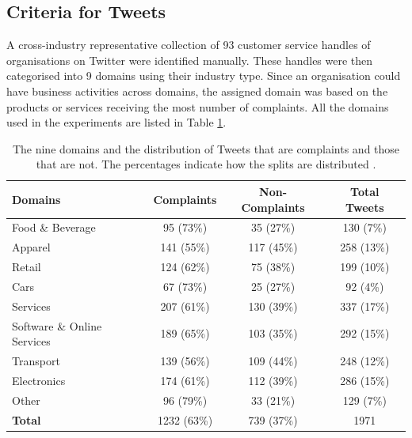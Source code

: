 \subsection{Criteria for Tweets}
A cross-industry representative collection of 93 customer service handles of organisations on Twitter were identified manually. These handles were then categorised into 9 domains using their industry type. Since an organisation could have business activities across domains, the assigned domain was based on the products or services receiving the most number of complaints. All the domains used in the experiments are listed in Table \ref{tab: domains}.
\begin{table}[ht]
    \captionsetup{font=small}
    \small
    \centering
    \begin{tabularx}{\textwidth}{|X|c|c|c|}
        \hline
        \rowcolor[gray]{0.7}
        \textbf{Domains}            & \textbf{Complaints} & \textbf{Non-Complaints} & \textbf{Total Tweets} \\
        \hline
        Food \& Beverage            & 95 \small{(73\%)}   & 35 \small{(27\%)}       & 130 \small{(7\%)}     \\
        \rowcolor[gray]{0.9}
        Apparel                     & 141 \small{(55\%)}  & 117 \small{(45\%)}      & 258 \small{(13\%)}    \\
        Retail                      & 124 \small{(62\%)}  & 75 \small{(38\%)}       & 199 \small{(10\%)}    \\
        \rowcolor[gray]{0.9}
        Cars                        & 67 \small{(73\%)}   & 25 \small{(27\%)}       & 92 \small{(4\%)}      \\
        Services                    & 207 \small{(61\%)}  & 130 \small{(39\%)}      & 337 \small{(17\%)}    \\
        \rowcolor[gray]{0.9}
        Software \& Online Services & 189 \small{(65\%)}  & 103 \small{(35\%)}      & 292 \small{(15\%)}    \\
        Transport                   & 139 \small{(56\%)}  & 109 \small{(44\%)}      & 248 \small{(12\%)}    \\
        \rowcolor[gray]{0.9}
        Electronics                 & 174 \small{(61\%)}  & 112 \small{(39\%)}      & 286 \small{(15\%)}    \\
        Other                       & 96 \small{(79\%)}   & 33 \small{(21\%)}       & 129 \small{(7\%)}     \\
        \hline
        \rowcolor[gray]{0.9}
        \textbf{Total}              & 1232 \small{(63\%)} & 739 \small{(37\%)}      & 1971                  \\
        \hline
    \end{tabularx}
    \caption{The nine domains and the distribution of Tweets that are complaints and those that are not. The percentages indicate how the splits are distributed \cite{preotiuc-pietro_automatically_2019}.}
    \label{tab: domains}
\end{table}

